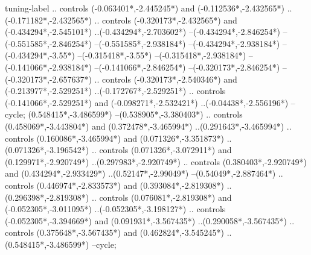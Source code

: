 {\begin{scope}[x=1mm,y=1mm,line width=\SCstroke mm,line cap=round,line join=round]
\begin{SCpart}{tuning-label}
.. controls ({-0.063401*\SCscale},{-2.445245*\SCscale}) and ({-0.112536*\SCscale},{-2.432565*\SCscale}) ..({-0.171182*\SCscale},{-2.432565*\SCscale})
.. controls ({-0.320173*\SCscale},{-2.432565*\SCscale}) and ({-0.434294*\SCscale},{-2.545101*\SCscale}) ..({-0.434294*\SCscale},{-2.703602*\SCscale})
--({-0.434294*\SCscale},{-2.846254*\SCscale})
--({-0.551585*\SCscale},{-2.846254*\SCscale})
--({-0.551585*\SCscale},{-2.938184*\SCscale})
--({-0.434294*\SCscale},{-2.938184*\SCscale})
--({-0.434294*\SCscale},{-3.55*\SCscale})
--({-0.315418*\SCscale},{-3.55*\SCscale})
--({-0.315418*\SCscale},{-2.938184*\SCscale})
--({-0.141066*\SCscale},{-2.938184*\SCscale})
--({-0.141066*\SCscale},{-2.846254*\SCscale})
--({-0.320173*\SCscale},{-2.846254*\SCscale})
--({-0.320173*\SCscale},{-2.657637*\SCscale})
.. controls ({-0.320173*\SCscale},{-2.540346*\SCscale}) and ({-0.213977*\SCscale},{-2.529251*\SCscale}) ..({-0.172767*\SCscale},{-2.529251*\SCscale})
.. controls ({-0.141066*\SCscale},{-2.529251*\SCscale}) and ({-0.098271*\SCscale},{-2.532421*\SCscale}) ..({-0.04438*\SCscale},{-2.556196*\SCscale})
--cycle;
 ({0.548415*\SCscale},{-3.486599*\SCscale})
--({0.538905*\SCscale},{-3.380403*\SCscale})
.. controls ({0.458069*\SCscale},{-3.443804*\SCscale}) and ({0.372478*\SCscale},{-3.465994*\SCscale}) ..({0.291643*\SCscale},{-3.465994*\SCscale})
.. controls ({0.160086*\SCscale},{-3.465994*\SCscale}) and ({0.071326*\SCscale},{-3.351873*\SCscale}) ..({0.071326*\SCscale},{-3.196542*\SCscale})
.. controls ({0.071326*\SCscale},{-3.072911*\SCscale}) and ({0.129971*\SCscale},{-2.920749*\SCscale}) ..({0.297983*\SCscale},{-2.920749*\SCscale})
.. controls ({0.380403*\SCscale},{-2.920749*\SCscale}) and ({0.434294*\SCscale},{-2.933429*\SCscale}) ..({0.52147*\SCscale},{-2.99049*\SCscale})
--({0.54049*\SCscale},{-2.887464*\SCscale})
.. controls ({0.446974*\SCscale},{-2.833573*\SCscale}) and ({0.393084*\SCscale},{-2.819308*\SCscale}) ..({0.296398*\SCscale},{-2.819308*\SCscale})
.. controls ({0.076081*\SCscale},{-2.819308*\SCscale}) and ({-0.052305*\SCscale},{-3.011095*\SCscale}) ..({-0.052305*\SCscale},{-3.198127*\SCscale})
.. controls ({-0.052305*\SCscale},{-3.394669*\SCscale}) and ({0.091931*\SCscale},{-3.567435*\SCscale}) ..({0.290058*\SCscale},{-3.567435*\SCscale})
.. controls ({0.375648*\SCscale},{-3.567435*\SCscale}) and ({0.462824*\SCscale},{-3.545245*\SCscale}) ..({0.548415*\SCscale},{-3.486599*\SCscale})
--cycle;\end{SCpart}
  \end{scope}%
}